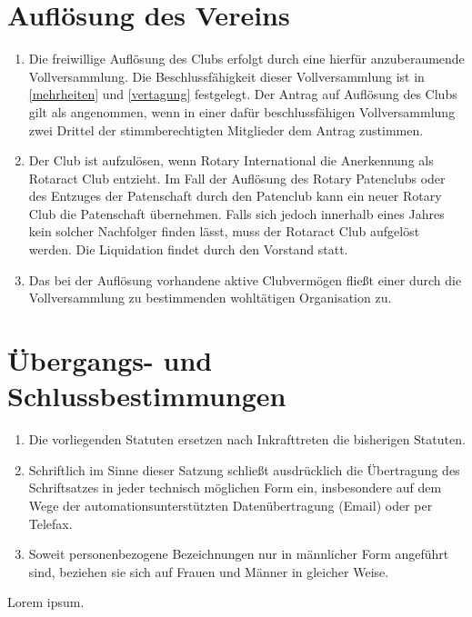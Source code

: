 \documentclass{statutclass}
\begin{document}
\section{Auflösung des Vereins}\label{aufloesung}
\begin{enumerate}
    \item Die freiwillige Auflösung des Clubs erfolgt durch eine hierfür anzuberaumende Vollversammlung. Die Beschlussfähigkeit dieser Vollversammlung ist in \ref{mehrheiten} und \ref{vertagung} festgelegt. Der Antrag auf Auflösung des Clubs gilt als angenommen, wenn in einer dafür beschlussfähigen Vollversammlung zwei Drittel der stimmberechtigten Mitglieder dem Antrag zustimmen.
    \item Der Club ist aufzulösen, wenn Rotary International die Anerkennung als Rotaract Club entzieht. Im Fall der Auflösung des Rotary Patenclubs oder des Entzuges der Patenschaft durch den Patenclub kann ein neuer Rotary Club die Patenschaft übernehmen. Falls sich jedoch innerhalb eines Jahres kein solcher Nachfolger finden lässt, muss der Rotaract Club aufgelöst werden. Die Liquidation findet durch den Vorstand statt.
    \item Das bei der Auflösung vorhandene aktive Clubvermögen fließt einer durch die Vollversammlung zu bestimmenden wohltätigen Organisation zu.
\end{enumerate}

\section{Übergangs- und Schlussbestimmungen}
\begin{enumerate}
    \item Die vorliegenden Statuten ersetzen nach Inkrafttreten die bisherigen Statuten.
    \item \glqq{}Schriftlich\grqq{} im Sinne dieser Satzung schließt ausdrücklich die Übertragung des Schriftsatzes in jeder technisch möglichen Form ein, insbesondere auf dem Wege der automationsunterstützten Datenübertragung (Email) oder per Telefax.
    \item Soweit personenbezogene Bezeichnungen nur in männlicher Form angeführt sind, beziehen sie sich auf Frauen und Männer in gleicher Weise.
\end{enumerate}

Lorem ipsum.
\end{document}
